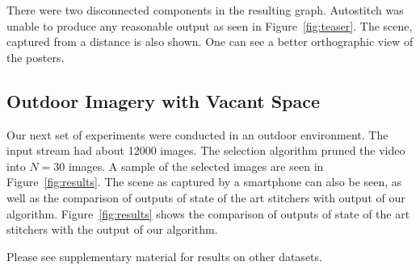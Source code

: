 There were two disconnected components in the resulting graph.
Autostitch was unable to produce any reasonable output as seen in
Figure~\ref{fig:teaser}.  The scene, captured from a distance is also
shown.  One can see a better orthographic view of the posters.

\subsection{Outdoor Imagery with Vacant Space}
Our next set of experiments were conducted in an outdoor
environment. The input stream had about 12000 images. The selection
algorithm pruned the video into $N=30$ images. A sample of the
selected images are seen in Figure~\ref{fig:results}.  The scene as
captured by a smartphone can also be seen, as well as the comparison
of outputs of state of the art stitchers with output of our
algorithm. Figure~\ref{fig:results} shows the comparison of outputs of
state of the art stitchers with the output of our algorithm.



Please see supplementary material for results on other datasets.
